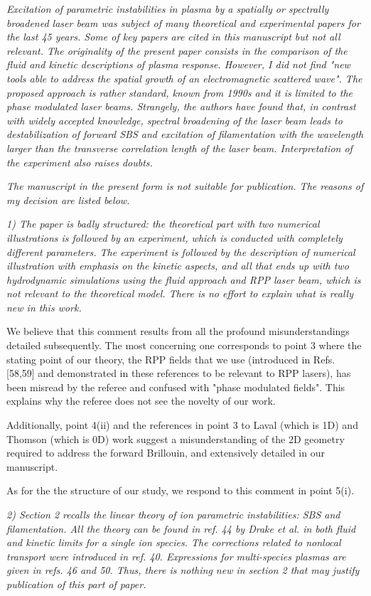 \documentclass{article}
\begin{document}
\textit{
Excitation of parametric instabilities in plasma by a spatially or spectrally broadened laser beam was subject of many theoretical and experimental papers for the last 45 years. Some of key papers are cited in this manuscript but not all relevant. The originality of the present paper consists in the comparison of the fluid and kinetic descriptions of plasma response. However, I did not find "new tools able to address the spatial growth of an electromagnetic scattered wave". The proposed approach is rather standard, known from 1990s and it is limited to the phase modulated laser beams. Strangely, the authors have found that, in contrast with widely accepted knowledge, spectral broadening of the laser beam leads to destabilization of forward SBS and excitation of filamentation with the wavelength larger than the transverse correlation length of the laser beam. Interpretation of the experiment also raises doubts. }

\textit{
The manuscript in the present form is not suitable for publication. The reasons of my decision are listed below. }


\textit{
1) The paper is badly structured: the theoretical part with two numerical illustrations is followed by an experiment, which is conducted with completely different parameters. The experiment is followed by the description of numerical illustration with emphasis on the kinetic aspects, and all that ends up with two hydrodynamic simulations using the fluid approach and RPP laser beam, which is not relevant to the theoretical model. There is no effort to explain what is really new in this work. }

We believe that this comment  results from all the profound  misunderstandings detailed subsequently. The most concerning one corresponds to point 3 where the stating point of our theory, the RPP fields that we use (introduced in Refs. [58,59] and demonstrated in these references to be relevant to RPP lasers), has been misread 
by the referee and confused with "phase modulated fields". This explains why the referee does not see the novelty of our work.  

Additionally, point 4(ii) and the references in point 3 to Laval (which is 1D) and Thomson  (which is 0D) work suggest a misunderstanding of the 2D geometry required to address the forward Brillouin, and extensively detailed in our manuscript. 

As for the the structure of our study, we respond to this comment in point 5(i).


\textit{
2) Section 2 recalls the linear theory of ion parametric instabilities: SBS and filamentation. All the theory can be found in ref. 44 by Drake et al. in both fluid and kinetic limits for a single ion species. The corrections related to nonlocal transport were introduced in ref. 40. Expressions for multi-species plasmas are given in refs. 46 and 50. Thus, there is nothing new in section 2 that may justify publication of this part of paper. }
\end{document}
